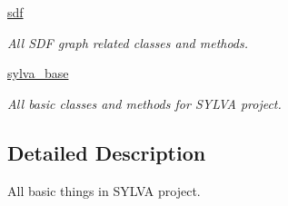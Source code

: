 \begin{DoxyCompactItemize}
\item 
 \hyperlink{namespacesylva_1_1base_1_1sdf}{sdf}
\begin{DoxyCompactList}\small\item\em All S\+DF graph related classes and methods. \end{DoxyCompactList}\item 
 \hyperlink{namespacesylva_1_1base_1_1sylva__base}{sylva\+\_\+base}
\begin{DoxyCompactList}\small\item\em All basic classes and methods for S\+Y\+L\+VA project. \end{DoxyCompactList}\end{DoxyCompactItemize}


\subsection{Detailed Description}
All basic things in S\+Y\+L\+VA project. 